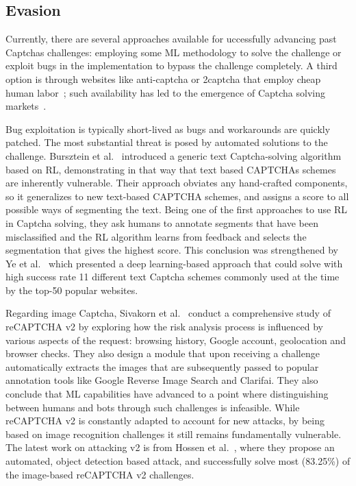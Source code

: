 \subsection{Evasion}

Currently, there are several approaches available for uccessfully advancing past Captchas challenges: employing some \gls{ML} methodology to solve the challenge or exploit bugs in the implementation to bypass the challenge completely.
A third option is through websites like anti-captcha or 2captcha that employ cheap human labor~\cite{weng2019towards}; such availability has led to the emergence of Captcha solving markets~\cite{motoyama2010re}.

Bug exploitation is typically short-lived as bugs and workarounds are quickly patched.
The most substantial threat is posed by automated solutions to the challenge.
Bursztein et al.~\cite{bursztein2014end} introduced a generic text Captcha-solving algorithm based on \gls{RL}, demonstrating in that way that text based CAPTCHAs schemes are inherently vulnerable.
Their approach obviates any hand-crafted components, so it generalizes to new text-based CAPTCHA schemes, and assigns a score to all possible ways of segmenting the text.
Being one of the first approaches to use \gls{RL} in Captcha solving, they ask humans to annotate segments that have been misclassified and the \gls{RL} algorithm learns from feedback and selects the segmentation that gives the highest score.
This conclusion was strengthened by Ye et al.~\cite{ye2018yet} which presented a deep learning-based approach that could solve with high success rate 11 different text Captcha schemes commonly used at the time by the top-50 popular websites.

Regarding image Captcha, Sivakorn et al.~\cite{sivakorn2016robot} conduct a comprehensive study of reCAPTCHA v2 by exploring how the risk analysis process is influenced by various aspects of the request: browsing history, Google account, geolocation and browser checks.
They also design a module that upon receiving a challenge automatically extracts the images that are subsequently passed to popular annotation tools like Google Reverse Image Search and Clarifai.
They also conclude that \gls{ML} capabilities have advanced to a point where distinguishing between humans and bots through such challenges is infeasible.
While reCAPTCHA v2 is constantly adapted to account for new attacks, by being based on image recognition challenges it still remains fundamentally vulnerable.
The latest work on attacking v2 is from Hossen et al.~\cite{hossen2020object}, where they propose an automated, object detection based attack, and successfully solve most (83.25\%) of the image-based reCAPTCHA v2 challenges.

